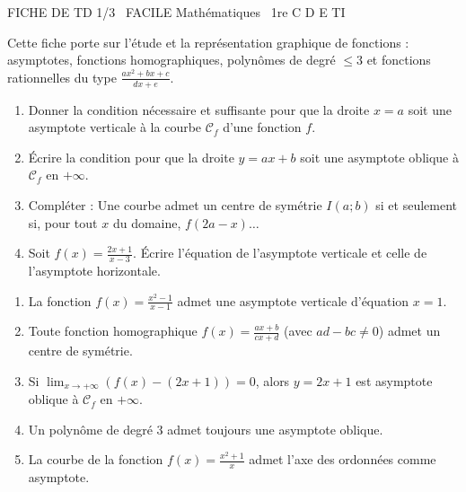 \documentclass[11pt]{article}
\begin{document}
\begin{tcolorbox}[enhanced,colback=popink,colframe=popink,arc=10pt,boxrule=0pt,left=12pt,right=12pt,top=9pt,bottom=9pt]
{\color{white}\popxbold\small FICHE DE TD 1/3 \textbullet\ FACILE \hfill Mathématiques \textbullet\ 1re C D E TI\par}
\end{tcolorbox}
\vspace{4pt}
Cette fiche porte sur l'étude et la représentation graphique de fonctions : asymptotes, fonctions homographiques, polynômes de degré $\le 3$ et fonctions rationnelles du type $\frac{ax^2+bx+c}{dx+e}$.

\begin{exercice}
\begin{enumerate}
    \item Donner la condition nécessaire et suffisante pour que la droite $x = a$ soit une asymptote verticale à la courbe $\mathcal{C}_f$ d'une fonction $f$.
    \item Écrire la condition pour que la droite $y = ax + b$ soit une asymptote oblique à $\mathcal{C}_f$ en $+\infty$.
    \item Compléter : Une courbe admet un centre de symétrie $I(a;b)$ si et seulement si, pour tout $x$ du domaine, $f(2a-x) \dots$
    \item Soit $f(x) = \frac{2x+1}{x-3}$. Écrire l'équation de l'asymptote verticale et celle de l'asymptote horizontale.
\end{enumerate}
\end{exercice}

\begin{exercice}
\begin{enumerate}
    \item La fonction $f(x) = \frac{x^2-1}{x-1}$ admet une asymptote verticale d'équation $x=1$.
    \item Toute fonction homographique $f(x) = \frac{ax+b}{cx+d}$ (avec $ad-bc \neq 0$) admet un centre de symétrie.
    \item Si $\lim_{x \to +\infty} (f(x) - (2x+1)) = 0$, alors $y=2x+1$ est asymptote oblique à $\mathcal{C}_f$ en $+\infty$.
    \item Un polynôme de degré 3 admet toujours une asymptote oblique.
    \item La courbe de la fonction $f(x) = \frac{x^2+1}{x}$ admet l'axe des ordonnées comme asymptote.
\end{enumerate}
\end{exercice}
\end{document}
